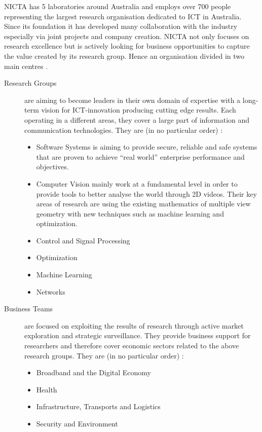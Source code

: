 \documentclass[10pt]{article}
\begin{document}
NICTA has 5 laboratories around Australia and employs over 700 people representing the largest research organisation dedicated to ICT in Australia. Since its foundation it has developed many collaboration with the industry especially via joint projects and company creation. NICTA not only focuses on research excellence but is actively looking for business opportunities to capture the value created by its research group. Hence an organisation divided in two main centres \autocite{PresentationBooklet}.

\begin{description}
\item[Research Groups] are aiming to become leaders in their own domain of expertise with a long-term vision for ICT-innovation producing cutting edge results. Each operating in a different areas, they cover a large part of information and communication technologies. They are (in no particular order) :
\begin{itemize}
\item Software Systems is aiming to provide secure, reliable and safe systems that are proven to achieve \enquote{real world} enterprise performance and objectives. 
\item Computer Vision mainly work at a fundamental level in order to provide tools to better analyse the world through 2D videos. Their key areas of research are using the existing mathematics of multiple view geometry with new techniques such as machine learning and optimization.
\item Control and Signal Processing 
\item Optimization 
\item Machine Learning
\item Networks
\end{itemize}

\item[Business Teams] are focused on exploiting the results of research through active market exploration and strategic surveillance. They provide business support for researchers and therefore cover economic sectors related to the above research groups. They are (in no particular order) :
\begin{itemize}
\item Broadband and the Digital Economy
\item Health
\item Infrastructure, Transports and Logistics
\item Security and Environment
\end{itemize}
\end{description}
\end{document}
